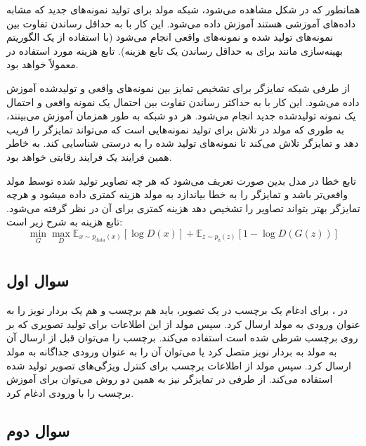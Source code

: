\documentclass{article}
\begin{document}
همانطور که در شکل مشاهده می‌شود، شبکه مولد برای تولید نمونه‌های جدید که مشابه داده‌های آموزشی هستند آموزش داده می‌شود. این کار با به حداقل رساندن تفاوت بین نمونه‌های تولید شده و نمونه‌های واقعی انجام می‌شود (با استفاده از یک الگوریتم بهینه‌سازی مانند  برای به حداقل رساندن یک تابع هزینه). تابع هزینه مورد استفاده در  معمولاً  خواهد بود.

از طرفی شبکه تمایزگر برای تشخیص تمایز بین نمونه‌های واقعی و تولیدشده آموزش داده می‌شود. این کار با به حداکثر رساندن تفاوت بین احتمال یک نمونه واقعی و احتمال یک نمونه تولیدشده جدید انجام می‌شود. هر دو شبکه به طور همزمان آموزش می‌بینند، به طوری که مولد در تلاش برای تولید نمونه‌هایی است که می‌تواند تمایزگر را فریب دهد و تمایزگر تلاش می‌کند تا نمونه‌های تولید شده را به درستی شناسایی کند. به خاطر همین فرایند یک فرایند رقابتی خواهد بود.

تابع خطا در مدل  بدین صورت تعریف می‌شود که هر چه تصاویر تولید شده توسط مولد واقعی‌تر باشد و تمایزگر را به خطا بیاندازد به مولد هزینه کمتری داده میشود و هرچه تمایزگر بهتر بتواند تصاویر را تشخیص دهد هزینه کمتری برای آن در نظر گرفته می‌شود. تابع هزینه به شرح زیر است:
$$
\min_{G}\max_{D}\mathbb{E}_{x\sim p_{\text{data}}(x)}[\log{D(x)}] +  \mathbb{E}_{z\sim p_{\text{z}}(z)}[1 - \log{D(G(z))}]
$$


\section{}
\subsection{سوال اول}

در ، برای ادغام یک برچسب در یک تصویر، باید هم برچسب و هم یک بردار نویز را به عنوان ورودی به مولد ارسال کرد. سپس مولد از این اطلاعات برای تولید تصویری که بر روی برچسب شرطی شده است استفاده می‌کند. برچسب را می‌توان قبل از ارسال آن به مولد به بردار نویز متصل کرد یا می‌توان آن را به عنوان ورودی جداگانه به مولد ارسال کرد. سپس مولد از اطلاعات برچسب برای کنترل ویژگی‌های تصویر تولید شده استفاده می‌کند. از طرفی در تمایزگر نیز به همین دو روش می‌توان برای آموزش برچسب را با ورودی ادغام کرد.


\subsection{سوال دوم}
\end{document}

